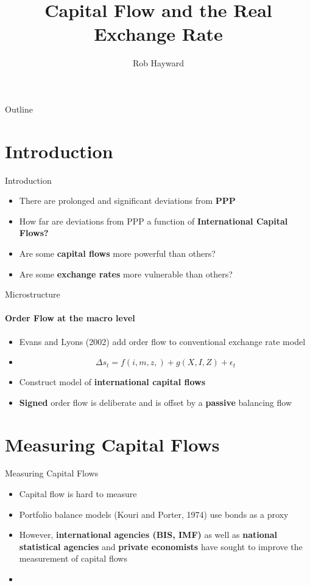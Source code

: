\documentclass[14pt,xcolor=pdftex,dvipsnames,table]{beamer}
\title{Capital Flow and the Real Exchange Rate}
\author{Rob Hayward}
\begin{document}
\begin{frame}
\titlepage
\end{frame}

\begin{frame}{Outline}
\tableofcontents
\end{frame}

\section{Introduction}
\begin{frame}{Introduction}
\begin{itemize}[<+-| alert@+>]
\item There are prolonged and significant deviations from \textbf{PPP}
\item How far are deviations from PPP a function of \textbf{International Capital Flows?}
\item Are some \textbf{capital flows} more powerful than others? 
\item Are some \textbf{exchange rates} more vulnerable than others?  
\end{itemize}
\end{frame}

\begin{frame}{Microstructure}
\framesubtitle{Order Flow at the macro level}
\begin{itemize}[<+-| alert@+>]
\item Evans and Lyons (2002) add order flow to conventional exchange rate model
\item \begin{equation}
 \Delta s_t=f(i,m,z,)+g(X,I,Z)+\epsilon_t
\end{equation}
\item Construct model of  \textbf{international capital flows} 
\item \textbf{Signed} order flow is deliberate and is offset by a \textbf{passive} balancing flow
\end{itemize}
\end{frame}


\section{Measuring Capital Flows}
\begin{frame}{Measuring Capital Flows}
\begin{itemize}[<+-| alert@+>]
\item Capital flow is hard to measure
\item Portfolio balance models (Kouri and Porter, 1974) use bonds as a proxy
\item However, \textbf{international agencies (BIS, IMF)} as well as \textbf {national statistical agencies} and \textbf{private economists} have sought to improve the measurement of capital flows
\item 
\end{itemize}
\end{frame}
\end{document}
